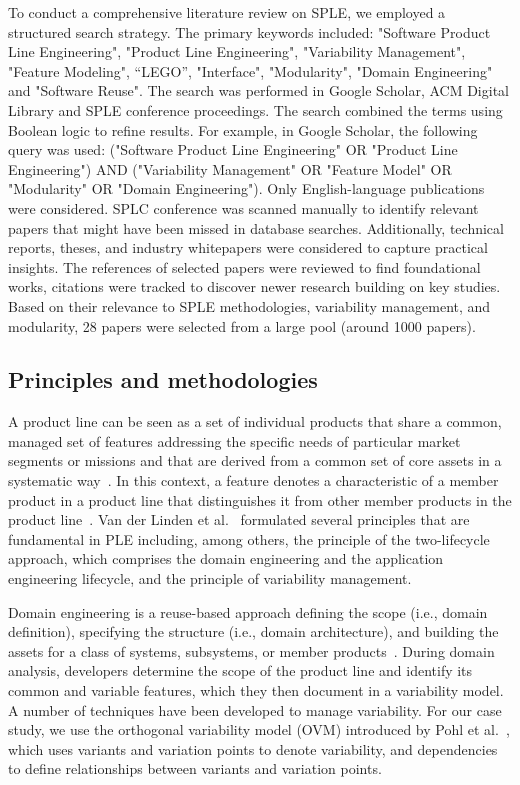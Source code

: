\documentclass[sigconf,review]{acmart}
\begin{document}
To conduct a comprehensive literature review on SPLE, we employed a structured search strategy. 
The primary keywords included: "Software Product Line Engineering", "Product Line Engineering", "Variability Management", "Feature Modeling", “LEGO”, "Interface", "Modularity", "Domain Engineering" and "Software Reuse". 
The search was performed in Google Scholar, ACM Digital Library and SPLE conference proceedings. 
The search combined the terms using Boolean logic to refine results. 
For example, in Google Scholar, the following query was used: ("Software Product Line Engineering" OR "Product Line Engineering") AND ("Variability Management" OR "Feature Model" OR "Modularity" OR "Domain Engineering"). 
Only English-language publications were considered. 
SPLC conference was scanned manually to identify relevant papers that might have been missed in database searches. 
Additionally, technical reports, theses, and industry whitepapers were considered to capture practical insights. 
The references of selected papers were reviewed to find foundational works, citations were tracked to discover newer research building on key studies. 
Based on their relevance to SPLE methodologies, variability management, and modularity, 28 papers were selected from a large pool (around 1000 papers).


\subsection{Principles and methodologies}
\label{sec:principles}

A product line can be seen as a set of individual products that share a common, managed set of features addressing the specific needs of particular market segments or missions and that are derived from a common set of core assets in a systematic way~\cite{Clements_2002}.
In this context, a feature denotes a characteristic of a member product in a product line that distinguishes it from other member products in the product line~\cite{ISO/IEC_26550}.
Van der Linden et al.~\cite{Linden_2007} formulated several principles that are fundamental in PLE including, among others, the principle of the two-lifecycle approach, which comprises the domain engineering and the application engineering lifecycle, and the principle of variability management.

Domain engineering is a reuse-based approach defining the scope (i.e., domain definition), specifying the structure (i.e., domain architecture), and building the assets for a class of systems, subsystems, or member products~\cite{ISO/IEC_26550}.
During domain analysis, developers determine the scope of the product line and identify its common and variable features, which they then document in a variability model. 
A number of techniques have been developed to manage variability.
For our case study, we use the orthogonal variability model (OVM) introduced by Pohl et al.~\cite{Pohl_2005}, which uses variants and variation points to denote variability, and dependencies to define relationships between variants and variation points.
\end{document}
